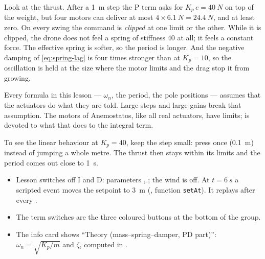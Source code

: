 Look at the thrust. After a \SI{1}{m} step the P term asks for $K_p\,e = \SI{40}{N}$ on top of the weight, but four motors can deliver at most $4 \times \SI{6.1}{N} = \SI{24.4}{N}$, and at least zero. On every swing the command is \emph{clipped} at one limit or the other. While it is clipped, the drone does not feel a spring of stiffness 40 at all; it feels a constant force. The effective spring is softer, so the period is longer. And the negative damping of \cref{eq:spring-lag} is four times stronger than at $K_p=10$, so the oscillation is held at the size where the motor limits and the drag stop it from growing.

\begin{watchout}
Every formula in this lesson — $\omega_n$, the period, the pole positions — assumes that the actuators do what they are told. Large steps and large gains break that assumption. The motors of Anemostatos, like all real actuators, have limits;  is devoted to what that does to the integral term.
\end{watchout}

To see the linear behaviour at $K_p = 40$, keep the step small: press  once (\SI{0.1}{m}) instead of jumping a whole metre. The thrust then stays within its limits and the period comes out close to \SI{1}{s}.


\begin{inapp}
\begin{itemize}[leftmargin=1.2em]
  \item Lesson  switches off I and D: parameters , ; the wind is off. At $t = \SI{6}{s}$ a scripted event moves the setpoint to \SI{3}{m} (, function \texttt{setAt}). It replays after every .
  \item The term switches are the three coloured buttons  at the bottom of the  group.
  \item The  info card shows \enquote{Theory (mass–spring–damper, PD part)}: $\omega_n = \sqrt{K_p/m}$ and $\zeta$, computed in .
\end{itemize}
\end{inapp}

